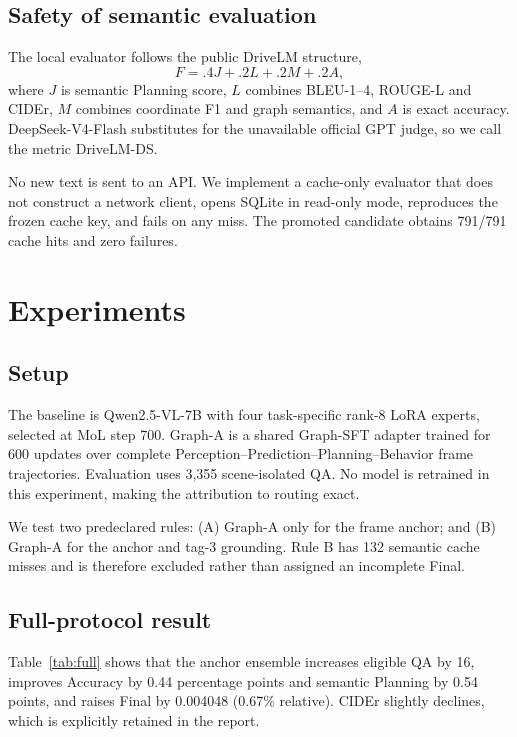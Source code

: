 \documentclass[10pt,twocolumn]{article}
\begin{document}
\subsection{Safety of semantic evaluation}
The local evaluator follows the public DriveLM structure,
\begin{equation}
F=.4J+.2L+.2M+.2A,
\end{equation}
where $J$ is semantic Planning score, $L$ combines BLEU-1--4, ROUGE-L and
CIDEr, $M$ combines coordinate F1 and graph semantics, and $A$ is exact
accuracy. DeepSeek-V4-Flash substitutes for the unavailable official GPT judge,
so we call the metric DriveLM-DS.

No new text is sent to an API. We implement a cache-only evaluator that does
not construct a network client, opens SQLite in read-only mode, reproduces the
frozen cache key, and fails on any miss. The promoted candidate obtains
791/791 cache hits and zero failures.

\section{Experiments}
\subsection{Setup}
The baseline is Qwen2.5-VL-7B with four task-specific rank-8 LoRA experts,
selected at MoL step 700. Graph-A is a shared Graph-SFT adapter trained for 600
updates over complete Perception--Prediction--Planning--Behavior frame
trajectories. Evaluation uses 3,355 scene-isolated QA. No model is retrained in
this experiment, making the attribution to routing exact.

We test two predeclared rules: (A) Graph-A only for the frame anchor; and (B)
Graph-A for the anchor and tag-3 grounding. Rule B has 132 semantic cache misses
and is therefore excluded rather than assigned an incomplete Final.

\subsection{Full-protocol result}
Table~\ref{tab:full} shows that the anchor ensemble increases eligible QA by 16,
improves Accuracy by 0.44 percentage points and semantic Planning by 0.54
points, and raises Final by 0.004048 (0.67\% relative). CIDEr slightly declines,
which is explicitly retained in the report.
\end{document}
